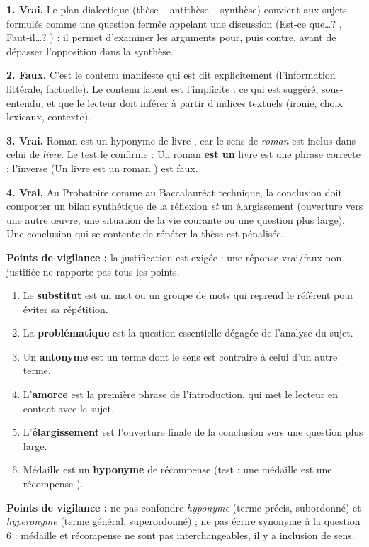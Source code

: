 \documentclass[11pt]{article}
\newcommand{\cle}[1]{{\popxbold\color{popdark}#1}}
\begin{document}
\begin{corrige}
\textbf{1. Vrai.} Le plan dialectique (thèse -- antithèse -- synthèse) convient aux sujets formulés comme une \cle{question fermée} appelant une discussion (\og Est-ce que\ldots ? \fg{}, \og Faut-il\ldots ? \fg{}) : il permet d'examiner les arguments pour, puis contre, avant de dépasser l'opposition dans la synthèse.

\textbf{2. Faux.} C'est le \cle{contenu manifeste} qui est dit explicitement (l'information littérale, factuelle). Le \cle{contenu latent} est l'implicite : ce qui est suggéré, sous-entendu, et que le lecteur doit inférer à partir d'indices textuels (ironie, choix lexicaux, contexte).

\textbf{3. Vrai.} \og Roman \fg{} est un \cle{hyponyme} de \og livre \fg{}, car le sens de \emph{roman} est inclus dans celui de \emph{livre}. Le test le confirme : \og Un roman \textbf{est un} livre \fg{} est une phrase correcte ; l'inverse (\og Un livre est un roman \fg{}) est faux.

\textbf{4. Vrai.} Au Probatoire comme au Baccalauréat technique, la conclusion doit comporter un \cle{bilan} synthétique de la réflexion \emph{et} un \cle{élargissement} (ouverture vers une autre œuvre, une situation de la vie courante ou une question plus large). Une conclusion qui se contente de répéter la thèse est pénalisée.

\textbf{Points de vigilance :} la justification est exigée : une réponse \og vrai/faux \fg{} non justifiée ne rapporte pas tous les points.
\end{corrige}

\begin{corrige}
\begin{enumerate}
\item Le \textbf{substitut} est un mot ou un groupe de mots qui reprend le référent pour éviter sa répétition.
\item La \textbf{problématique} est la question essentielle dégagée de l'analyse du sujet.
\item Un \textbf{antonyme} est un terme dont le sens est contraire à celui d'un autre terme.
\item L'\textbf{amorce} est la première phrase de l'introduction, qui met le lecteur en contact avec le sujet.
\item L'\textbf{élargissement} est l'ouverture finale de la conclusion vers une question plus large.
\item \og Médaille \fg{} est un \textbf{hyponyme} de \og récompense \fg{} (test : \og une médaille est une récompense \fg{}).
\end{enumerate}
\textbf{Points de vigilance :} ne pas confondre \emph{hyponyme} (terme précis, subordonné) et \emph{hyperonyme} (terme général, superordonné) ; ne pas écrire \og synonyme \fg{} à la question 6 : médaille et récompense ne sont pas interchangeables, il y a inclusion de sens.
\end{corrige}
\end{document}
